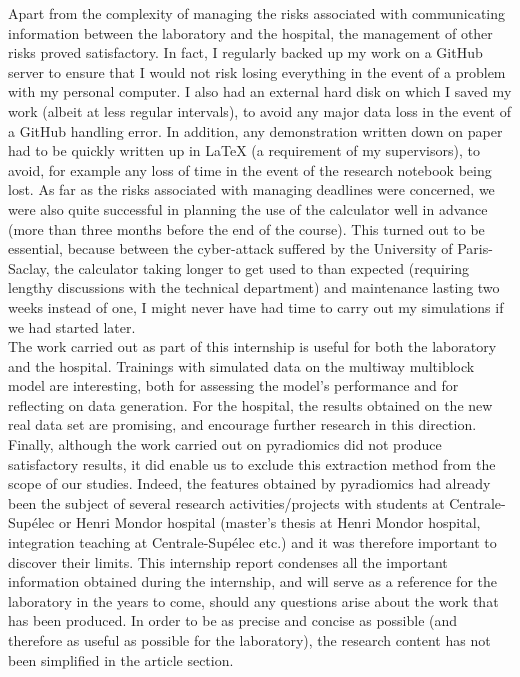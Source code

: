 \documentclass[preprint,12pt]{elsarticle}
\begin{document}
\indent Apart from the complexity of managing the risks associated with communicating information between the laboratory and the hospital, the management of other risks proved satisfactory. In fact, I regularly backed up my work on a GitHub server to ensure that I would not risk losing everything in the event of a problem with my personal computer. I also had an external hard disk on which I saved my work (albeit at less regular intervals), to avoid any major data loss in the event of a GitHub handling error. In addition, any demonstration written down on paper had to be quickly written up in LaTeX (a requirement of my supervisors), to avoid, for example any loss of time in the event of the research notebook being lost. As far as the risks associated with managing deadlines were concerned, we were also quite successful in planning the use of the calculator well in advance (more than three months before the end of the course). This turned out to be essential, because between the cyber-attack suffered by the University of Paris-Saclay, the calculator taking longer to get used to than expected (requiring lengthy discussions with the technical department) and maintenance lasting two weeks instead of one, I might never have had time to carry out my simulations if we had started later.\\
\indent The work carried out as part of this internship is useful for both the laboratory and the hospital. Trainings with simulated data on the multiway multiblock model are interesting, both for assessing the model's performance and for reflecting on data generation. For the hospital, the results obtained on the new real data set are promising, and encourage further research in this direction. Finally, although the work carried out on pyradiomics did not produce satisfactory results, it did enable us to exclude this extraction method from the scope of our studies. Indeed, the features obtained by pyradiomics had already been the subject of several research activities/projects with students at Centrale-Supélec or Henri Mondor hospital (master's thesis at Henri Mondor hospital, integration teaching at Centrale-Supélec etc.) and it was therefore important to discover their limits. This internship report condenses all the important information obtained during the internship, and will serve as a reference for the laboratory in the years to come, should any questions arise about the work that has been produced. In order to be as precise and concise as possible (and therefore as useful as possible for the laboratory), the research content has not been simplified in the article section.\\
\end{document}
